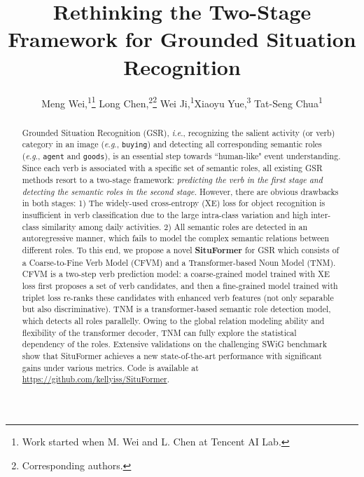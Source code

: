 \documentclass[letterpaper]{article} %
\title{Rethinking the Two-Stage Framework for Grounded Situation Recognition}
\author {
    Meng Wei,\textsuperscript{\rm 1}\thanks{Work started when M. Wei and L. Chen at Tencent AI Lab.}
    Long Chen,\textsuperscript{\rm 2}\footnotemark[1]\thanks{Corresponding authors.}
    Wei Ji,\textsuperscript{\rm 1}\footnotemark[2]
    Xiaoyu Yue,\textsuperscript{\rm 3}
    Tat-Seng Chua\textsuperscript{\rm 1}\\
}
\newcommand{\ie}{\textit{i}.\textit{e}.}
\newcommand{\eg}{\textit{e}.\textit{g}.}
\begin{document}


\maketitle


\begin{abstract}
Grounded Situation Recognition (GSR), \ie, recognizing the salient activity (or verb) category in an image (\eg, \texttt{buying}) and detecting all corresponding semantic roles (\eg, \texttt{agent} and \texttt{goods}), is an essential step towards ``human-like" event understanding. Since each verb is associated with a specific set of semantic roles, all existing GSR methods resort to a two-stage framework: \emph{predicting the verb in the first stage and detecting the semantic roles in the second stage.} However, there are obvious drawbacks in both stages: 1) The widely-used cross-entropy (XE) loss for object recognition is insufficient in verb classification due to the large intra-class variation and high inter-class similarity among daily activities. 2) All semantic roles are detected in an autoregressive manner, which fails to model the complex semantic relations between different roles. To this end, we propose a novel \textbf{SituFormer} for GSR which consists of a Coarse-to-Fine Verb Model (CFVM) and a Transformer-based Noun Model (TNM). CFVM is a two-step verb prediction model: a coarse-grained model trained with XE loss first proposes a set of verb candidates, and then a fine-grained model trained with triplet loss re-ranks these candidates with enhanced verb features (not only separable but also discriminative).
TNM is a transformer-based semantic role detection model, which detects all roles parallelly.
Owing to the global relation modeling ability and flexibility of the transformer decoder, TNM can fully explore the statistical dependency of the roles.
Extensive validations on the challenging SWiG benchmark show that SituFormer achieves a new state-of-the-art performance with significant gains under various metrics.
Code is available at \url{https://github.com/kellyiss/SituFormer}.

\end{abstract}
\end{document}
